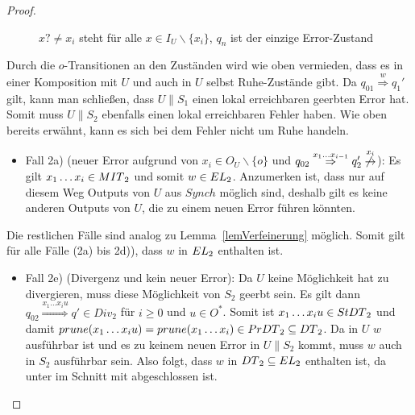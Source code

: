 \begin{proof}
\begin{itemize}
\begin{figure} [h!tbp]
\begin{center}
        \caption{$x?\neq x_i$ steht für alle $x\in I_U\backslash\{x_i\}$, $q_n$
          ist der einzige Error-Zustand}
\label{UmitEundO}
      \end{center}
      \end{figure}
      Durch die $o$-Transitionen an den Zuständen wird wie oben vermieden, dass
      es in einer Komposition mit $U$ und auch in $U$ selbst Ruhe-Zustände
      gibt. Da $q_{01} \overset{w}{\Rightarrow} q_1'$ gilt, kann man schließen,
      dass $U\|S_1$ einen lokal erreichbaren geerbten Error hat. Somit muss
      $U\|S_2$ ebenfalls einen lokal erreichbaren Fehler haben. Wie oben
      bereits erwähnt, kann es sich bei dem Fehler nicht um Ruhe handeln.
      \begin{itemize}
        \item Fall 2a) (neuer Error aufgrund von $x_i\in O_U\backslash\{o\}$
          und $q_{02} \overset{x_1\dots x_{i-1}}{\Rightarrow} q_2'
          \overset{x_i}{\not{\hspace{-0.1cm}\rightarrow}}$): Es gilt $x_1\dots
          x_i\in MIT{}_2$ und somit $w\in EL{}_2$. Anzumerken ist, dass nur
          auf diesem Weg Outputs von $U$ aus $Synch$ möglich sind, deshalb gilt
          es keine anderen Outputs von $U$, die zu einem neuen Error führen
          könnten.
      \end{itemize}
      Die restlichen Fälle sind analog zu Lemma~\ref{lemVerfeinerung} möglich.
      Somit gilt für alle Fälle (2a) bis 2d)), dass $w$ in $EL{}_2$ enthalten
      ist.
      \begin{itemize}
        \item Fall 2e) (Divergenz und kein neuer Error): Da $U$ keine
          Möglichkeit hat zu divergieren, muss diese Möglichkeit von $S_2$
          geerbt sein. Es gilt dann $q_{02} \overset{x_1\dots
          x_iu}{\Rightarrow} q'\in Div_2$ für $i\geq 0$ und $u\in O^*$. Somit
          ist $x_1\dots x_iu\in StDT{}_2$ und damit $prune{}(x_1\dots x_iu)=
          prune{}(x_1\dots x_i)\in PrDT{}_2\subseteq DT{}_2$. Da in $U$ $w$
          ausführbar ist und es zu keinem neuen Error in $U\|S_2$ kommt, muss
          $w$ auch in $S_2$ ausführbar sein. Also folgt, dass $w$ in $DT{}_2
          \subseteq EL{}_2$ enthalten ist, da \DT{} unter \cont{} im Schnitt
          mit \EL{} abgeschlossen ist.
      \end{itemize}
  \end{itemize}
\end{proof}

